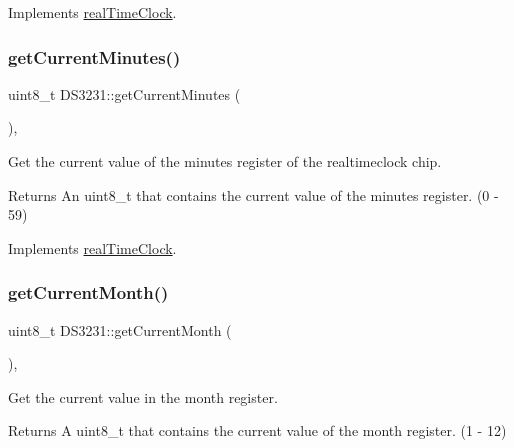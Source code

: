 Implements \mbox{\hyperlink{classreal_time_clock_a2861a9bc75466a762b4cd8ce37193247}{real\+Time\+Clock}}.

\mbox{\label{class_d_s3231_a08f384e1897214d4a201aaaecde3b8a4}} 
\subsubsection{\texorpdfstring{get\+Current\+Minutes()}{getCurrentMinutes()}}
{\footnotesize\ttfamily uint8\+\_\+t D\+S3231\+::get\+Current\+Minutes (\begin{DoxyParamCaption}{ }\end{DoxyParamCaption})\hspace{0.3cm}{\ttfamily [override]}, {\ttfamily [virtual]}}



Get the current value of the minutes register of the realtimeclock chip. 

\begin{DoxyReturn}{Returns}
An uint8\+\_\+t that contains the current value of the minutes register. (0 -\/ 59) 
\end{DoxyReturn}


Implements \mbox{\hyperlink{classreal_time_clock_a8436f171be03d35a931004b3f3b144e9}{real\+Time\+Clock}}.

\mbox{\label{class_d_s3231_a8d7a965802afacc16b4d5af86e0ed11e}} 
\subsubsection{\texorpdfstring{get\+Current\+Month()}{getCurrentMonth()}}
{\footnotesize\ttfamily uint8\+\_\+t D\+S3231\+::get\+Current\+Month (\begin{DoxyParamCaption}{ }\end{DoxyParamCaption})\hspace{0.3cm}{\ttfamily [override]}, {\ttfamily [virtual]}}



Get the current value in the month register. 

\begin{DoxyReturn}{Returns}
A uint8\+\_\+t that contains the current value of the month register. (1 -\/ 12) 
\end{DoxyReturn}



